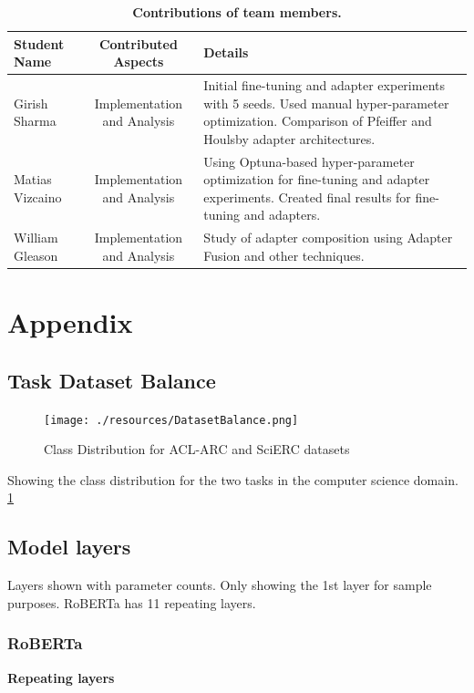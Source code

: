 \documentclass[draft,10pt,twocolumn,letterpaper]{article}
\begin{document}
\begin{table}[h]
\begin{center}
\begin{tabular}{|l|c|p{8cm}|}
\hline
\textbf{Student Name} & \textbf{Contributed Aspects} & \textbf{Details} \\
\hline
Girish Sharma & Implementation and Analysis & Initial fine-tuning and adapter experiments with 5 seeds. Used manual hyper-parameter optimization. Comparison of Pfeiffer and Houlsby adapter architectures.  \\
Matias Vizcaino & Implementation and Analysis & Using Optuna-based hyper-parameter optimization for fine-tuning and adapter experiments. Created final results for fine-tuning and adapters. \\
William Gleason & Implementation and Analysis & Study of adapter composition using Adapter Fusion and other techniques. \\
\hline
\end{tabular}
\end{center}
\caption{\textbf{Contributions of team members.}}
\label{tab:contributions}
\end{table}
\FloatBarrier


\section{Appendix}
\subsection{Task Dataset Balance}
\begin{figure}[h] %
    \centering %
    \texttt{[image: ./resources/DatasetBalance.png]} %
    \caption{Class Distribution for ACL-ARC and SciERC datasets} %
    \label{fig:example} %
\end{figure}
Showing the class distribution for the two tasks in the computer science domain. \ref{fig:example}
\FloatBarrier

\subsection{Model layers}
Layers shown with parameter counts. Only showing the 1st layer for sample purposes. RoBERTa has 11 repeating layers.
\subsubsection{RoBERTa }
\label{sec:robertamodel} 
\textbf{Repeating layers}
\end{document}
